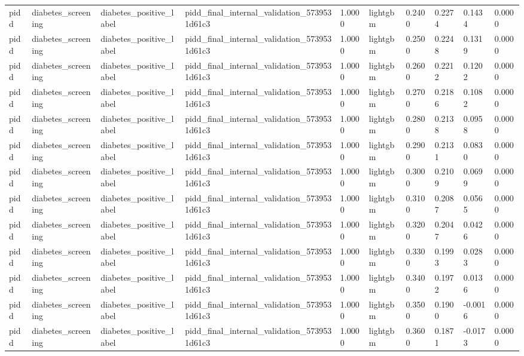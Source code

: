\begin{tabular}{llllllllll}
pidd & diabetes\_screening & diabetes\_positive\_label & pidd\_final\_internal\_validation\_5739531d61c3 & 1.0000 & lightgbm & 0.2400 & 0.2274 & 0.1434 & 0.0000 \\
pidd & diabetes\_screening & diabetes\_positive\_label & pidd\_final\_internal\_validation\_5739531d61c3 & 1.0000 & lightgbm & 0.2500 & 0.2248 & 0.1319 & 0.0000 \\
pidd & diabetes\_screening & diabetes\_positive\_label & pidd\_final\_internal\_validation\_5739531d61c3 & 1.0000 & lightgbm & 0.2600 & 0.2212 & 0.1202 & 0.0000 \\
pidd & diabetes\_screening & diabetes\_positive\_label & pidd\_final\_internal\_validation\_5739531d61c3 & 1.0000 & lightgbm & 0.2700 & 0.2186 & 0.1082 & 0.0000 \\
pidd & diabetes\_screening & diabetes\_positive\_label & pidd\_final\_internal\_validation\_5739531d61c3 & 1.0000 & lightgbm & 0.2800 & 0.2138 & 0.0958 & 0.0000 \\
pidd & diabetes\_screening & diabetes\_positive\_label & pidd\_final\_internal\_validation\_5739531d61c3 & 1.0000 & lightgbm & 0.2900 & 0.2131 & 0.0830 & 0.0000 \\
pidd & diabetes\_screening & diabetes\_positive\_label & pidd\_final\_internal\_validation\_5739531d61c3 & 1.0000 & lightgbm & 0.3000 & 0.2109 & 0.0699 & 0.0000 \\
pidd & diabetes\_screening & diabetes\_positive\_label & pidd\_final\_internal\_validation\_5739531d61c3 & 1.0000 & lightgbm & 0.3100 & 0.2087 & 0.0565 & 0.0000 \\
pidd & diabetes\_screening & diabetes\_positive\_label & pidd\_final\_internal\_validation\_5739531d61c3 & 1.0000 & lightgbm & 0.3200 & 0.2047 & 0.0426 & 0.0000 \\
pidd & diabetes\_screening & diabetes\_positive\_label & pidd\_final\_internal\_validation\_5739531d61c3 & 1.0000 & lightgbm & 0.3300 & 0.1993 & 0.0283 & 0.0000 \\
pidd & diabetes\_screening & diabetes\_positive\_label & pidd\_final\_internal\_validation\_5739531d61c3 & 1.0000 & lightgbm & 0.3400 & 0.1972 & 0.0136 & 0.0000 \\
pidd & diabetes\_screening & diabetes\_positive\_label & pidd\_final\_internal\_validation\_5739531d61c3 & 1.0000 & lightgbm & 0.3500 & 0.1900 & -0.0016 & 0.0000 \\
pidd & diabetes\_screening & diabetes\_positive\_label & pidd\_final\_internal\_validation\_5739531d61c3 & 1.0000 & lightgbm & 0.3600 & 0.1871 & -0.0173 & 0.0000 \\

\end{tabular}
